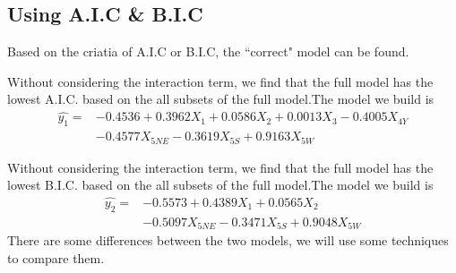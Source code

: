 \documentclass[a4paper,11pt,onecolumn,twoside]{article}
\begin{document}
\subsection{Using A.I.C \& B.I.C}
Based on the criatia of A.I.C or B.I.C, the ``correct" model can be found. \par
Without considering the interaction term, we find that the full model has the lowest A.I.C. based on the all subsets of the full model.The model we build is
\begin{equation}
\begin{split}
\hat{y_1}= &-0.4536+0.3962X_1+0.0586X_2+0.0013X_3-0.4005X_{4Y}\\ &-0.4577X_{5NE}-0.3619X_{5S}+0.9163X_{5W}
\end{split}
\end{equation} \par
Without considering the interaction term, we find that the full model has the lowest B.I.C. based on the all subsets of the full model.The model we build is
\begin{equation}
\begin{split}
\hat{y_2}= &-0.5573+0.4389X_1+0.0565X_2\\&-0.5097X_{5NE}     -0.3471X_{5S}+0.9048X_{5W} 
\end{split}
\end{equation}
There are some differences between the two models, we will use some techniques to compare them.
\end{document}
